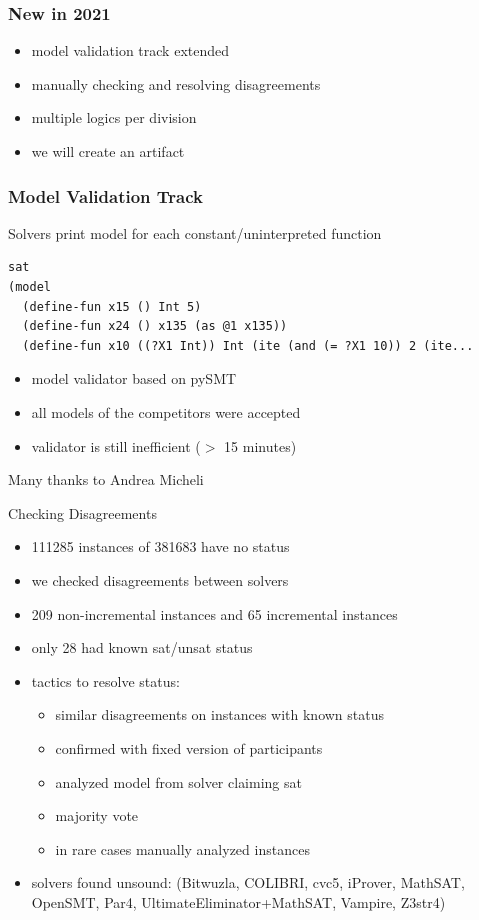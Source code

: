 \documentclass[table]{beamer}
\def\emph#1{\textcolor{MYblue}{#1}}
\begin{document}
\begin{frame}
  \frametitle{New in 2021}

  \begin{itemize}
  \item model validation track extended
  \item manually checking and resolving disagreements
  \item multiple logics per division
  \item we will create an artifact
  \end{itemize}
\end{frame}


\begin{frame}[fragile]
  \frametitle{Model Validation Track}

  Solvers print model for each constant/uninterpreted function
\begin{verbatim}
sat
(model
  (define-fun x15 () Int 5)
  (define-fun x24 () x135 (as @1 x135))
  (define-fun x10 ((?X1 Int)) Int (ite (and (= ?X1 10)) 2 (ite...
\end{verbatim}

  \begin{itemize}
  \item model validator based on pySMT
  \item all models of the competitors were accepted
  \item validator is still inefficient ($>$ 15 minutes)
  \end{itemize}

  \bigskip

  Many thanks to \emph{Andrea Micheli}
\end{frame}

\begin{frame}{Checking Disagreements}

  \begin{itemize}
  \item 111285 instances of 381683 have no status
  \item we checked disagreements between solvers
  \item 209 non-incremental instances
    and 65 incremental instances
  \item only 28 had known sat/unsat status
  \item tactics to resolve status:
    \begin{itemize}
    \item similar disagreements on instances with known status
    \item confirmed with fixed version of participants
    \item analyzed model from solver claiming sat
    \item majority vote
    \item in rare cases manually analyzed instances
    \end{itemize}
  \item solvers found unsound: (Bitwuzla, COLIBRI, cvc5, iProver, MathSAT, OpenSMT, Par4, UltimateEliminator+MathSAT, Vampire, Z3str4)
  \end{itemize}
\end{frame}
\end{document}
